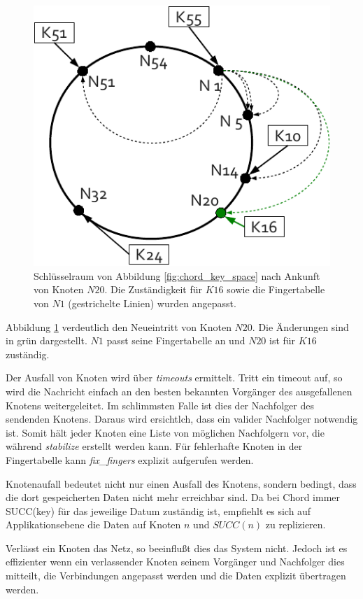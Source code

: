 \begin{figure}[htb]
\centering
\includegraphics{grafics/chord_new_node.pdf}
\caption{Schlüsselraum von Abbildung \ref{fig:chord_key_space} nach Ankunft von Knoten $N20$. Die Zuständigkeit für $K16$ sowie die Fingertabelle von $N1$ (gestrichelte Linien) wurden angepasst.}
\label{fig:chord_new_node}
\end{figure}

Abbildung \ref{fig:chord_new_node} verdeutlich den Neueintritt von Knoten $N20$. Die Änderungen sind in grün dargestellt. $N1$ passt seine Fingertabelle an und $N20$ ist für $K16$ zuständig.

Der Ausfall von Knoten wird über \emph{timeouts} ermittelt. Tritt ein timeout auf, so wird die Nachricht einfach an den besten bekannten Vorgänger des ausgefallenen Knotens weitergeleitet. Im schlimmsten Falle ist dies der Nachfolger des sendenden Knotens. Daraus wird ersichtlch, dass ein valider Nachfolger notwendig ist. Somit hält jeder Knoten eine Liste von möglichen Nachfolgern vor, die während \emph{stabilize} erstellt werden kann. Für fehlerhafte Knoten in der Fingertabelle kann \emph{fix\_fingers} explizit aufgerufen werden.

Knotenaufall bedeutet nicht nur einen Ausfall des Knotens, sondern bedingt, dass die dort gespeicherten Daten nicht mehr erreichbar sind. Da bei Chord immer SUCC(key) für das jeweilige Datum zuständig ist, empfiehlt es sich auf Applikationsebene die Daten auf Knoten $n$ und $SUCC(n)$ zu replizieren.

Verlässt ein Knoten das Netz, so beeinflußt dies das System nicht. Jedoch ist es effizienter wenn ein verlassender Knoten seinem Vorgänger und Nachfolger dies mitteilt, die Verbindungen angepasst werden und die Daten explizit übertragen werden.

